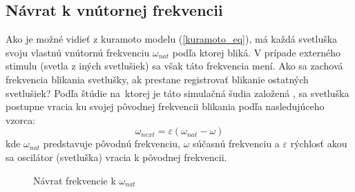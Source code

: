 \documentclass[a4paper, 11pt]{article}
\begin{document}

\subsection{Návrat k vnútornej frekvencii} \label{sec_backtofreq}
Ako je možné vidieť z kuramoto modelu (\ref{kuramoto_eq}), má každá svetluška svoju vlastnú vnútornú frekvenciu $\omega_{nat}$ podľa ktorej bliká. V prípade externého stimulu (svetla z iných svetlušiek) sa však táto frekvencia mení. Ako sa zachová frekvencia blikania svetlušky, ak prestane registrovať blikanie ostatných svetlušiek?
Podľa štúdie na~ktorej je táto simulačná šudia založená \cite{Svetlusky}, sa svetluška postupne vracia ku svojej pôvodnej frekvencii blikania podľa nasledujúceho vzorca:
\vspace{1em}
\begin{equation} \label{damping_eq}
   \omega_{next} = \varepsilon(\omega_{nat} - \omega)
\end{equation}
kde $\omega_{nat}$ predstavuje pôvodnú frekvenciu, $\omega$ súčasnú frekvenciu a $\varepsilon$ rýchlosť akou sa oscilátor (svetluška) vracia k pôvodnej frekvencii. \cite{Svetlusky}

\begin{figure}[h]
    \centering
\caption{Návrat frekvencie k $\omega_{nat}$\label{ToNorm}}
\end{figure}
\end{document}
